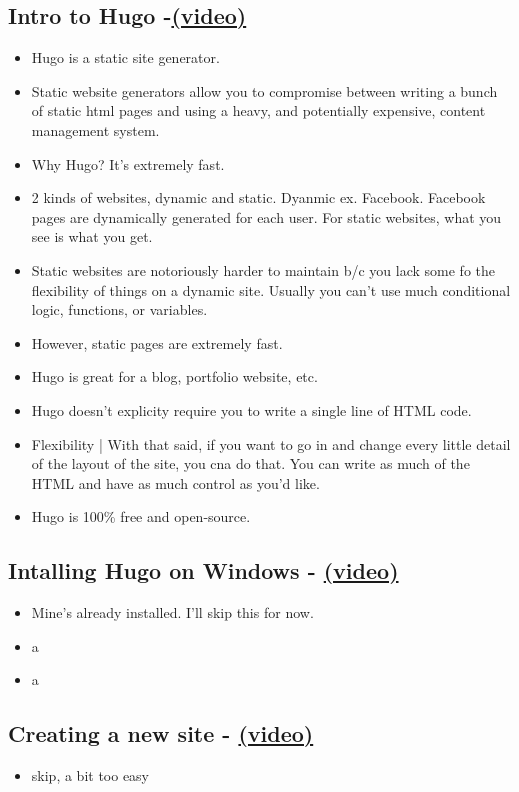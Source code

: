 \subsection{Intro to Hugo -\href{https://youtu.be/qtIqKaDlqXo}{(video)} }
\begin{itemize}
\item
	Hugo is a static site generator.
\item
	Static website generators allow you to compromise between writing a bunch of static html pages and using a heavy, and potentially expensive, content management system.
\item
	Why Hugo? It's extremely fast.
\item
	2 kinds of websites, dynamic and static. Dyanmic ex. Facebook. Facebook pages are dynamically generated for each user. For static websites, what you see is what you get.
\item
	Static websites are notoriously harder to maintain b/c you lack some fo the flexibility of things  on a dynamic site. Usually you can't use much conditional logic, functions, or variables.
\item
	However, static pages are extremely fast.
\item
	Hugo is great for a blog, portfolio website, etc.
\item
	Hugo doesn't explicity require you to write a single line of HTML code.
\item
	Flexibility | With that said, if you want to go in and change every little detail of the layout of the site, you cna do that. You can write as much of the HTML and have as much control as you'd like.
\item
	Hugo is 100\% free and open-source.
\end{itemize}

\subsection{Intalling Hugo on Windows - \href{https://youtu.be/G7umPCU-8xc?list=PLLAZ4kZ9dFpOnyRlyS-liKL5ReHDcj4G3}{(video)} }
\begin{itemize}
\item
	Mine's already installed. I'll skip this for now.
\item
	a
\item
	a
\end{itemize}

\subsection{Creating a new site - \href{https://youtu.be/sB0HLHjgQ7E?list=PLLAZ4kZ9dFpOnyRlyS-liKL5ReHDcj4G3}{(video)} }
\begin{itemize}
\item skip, a bit too easy

\end{itemize}

